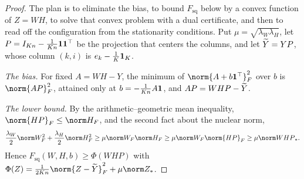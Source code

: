 \begin{refsection}

\begin{proof}
The plan is to eliminate the bias, to bound $F_{\mathrm{sq}}$ below by a convex function of $Z=WH$, to solve that convex problem with a dual certificate, and then to read off the configuration from the stationarity conditions. Put $\mu=\sqrt{\lambda_W\lambda_H}$, let $P=I_{Kn}-\frac1{Kn}\mathbf 1\mathbf 1^\top$ be the projection that centers the columns, and let $\widetilde Y=YP$, whose column $(k,i)$ is $e_k-\frac1K\mathbf 1_K$.

\emph{The bias.} For fixed $A=WH-Y$, the minimum of $\norm{A+b\collapseone^\top}_F^2$ over $b$ is $\norm{AP}_F^2$, attained only at $b=-\frac1{Kn}A\mathbf 1$, and $AP=WHP-\widetilde Y$.

\emph{The lower bound.} By the arithmetic--geometric mean inequality, $\norm{HP}_F\le\norm H_F$, and the second fact about the nuclear norm,
\begin{equation}\label{eq:collapse:pen}
  \frac{\lambda_W}2\norm W_F^2+\frac{\lambda_H}2\norm H_F^2\ge\mu\norm W_F\norm H_F\ge\mu\norm W_F\norm{HP}_F\ge\mu\collapsenuc{WHP}.
\end{equation}
Hence $F_{\mathrm{sq}}(W,H,b)\ge\Phi(WHP)$ with $\Phi(Z)=\frac1{2Kn}\norm{Z-\collapseYt}_F^2+\mu\collapsenuc Z$.


\end{proof}
\end{refsection}
